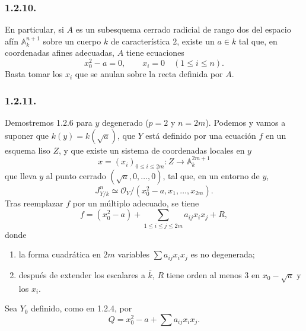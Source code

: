 \subsubsection*{1.2.10.}
En particular, si $A$ es un subesquema cerrado radicial de rango dos
del espacio afín $\mathbb A_k^{n+1}$ sobre un cuerpo $k$ de
característica $2$, existe un $a\in k$ tal que, en coordenadas afines
adecuadas, $A$ tiene ecuaciones
\[
x_0^2-a=0,
\qquad x_i=0\quad(1\leq i\leq n).
\]
Basta tomar los $x_i$ que se anulan sobre la recta definida por $A$.

\subsubsection*{1.2.11.}
Demostremos 1.2.6 para $y$ degenerado ($p=2$ y $n=2m$). Podemos y
vamos a suponer que $k(y)=k(\sqrt a)$, que $Y$ está definido por una
ecuación $f$ en un esquema liso $Z$, y que existe un sistema de
coordenadas locales en $y$
\[
x=(x_i)_{0\leq i\leq2m}:
Z\longrightarrow\mathbb A_k^{2m+1}
\]
que lleva $y$ al punto cerrado $(\sqrt a,0,\ldots,0)$, tal que, en un
entorno de $y$,
\[
J^n_{Y/k}\simeq
\mathcal O_Y/(x_0^2-a,x_1,\ldots,x_{2m}).
\]
Tras reemplazar $f$ por un múltiplo adecuado, se tiene
\[
f=(x_0^2-a)+
 \sum_{1\leq i\leq j\leq2m}a_{ij}x_ix_j+R,
\]
donde
\begin{enumerate}[label=(\alph*),leftmargin=2.6em]
\item la forma cuadrática en $2m$ variables
$\sum a_{ij}x_ix_j$ es no degenerada;
\item después de extender los escalares a $\bar k$, $R$ tiene orden al
menos $3$ en $x_0-\sqrt a$ y los $x_i$.
\end{enumerate}

\pageoriginale

Sea $Y_0$ definido, como en 1.2.4, por
\[
Q=x_0^2-a+\sum a_{ij}x_ix_j.
\]

